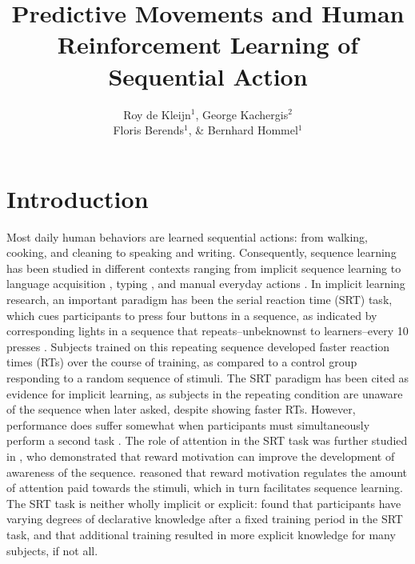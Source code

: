 \documentclass[man,floatsintext]{apa6}
\title{Predictive Movements and Human Reinforcement Learning of Sequential Action}
\author{
 Roy de Kleijn$^{1}$, George Kachergis$^{2}$ \\
 Floris Berends$^{1}$, \& Bernhard Hommel$^{1}$
}
\affiliation{
$^{1}$Cognitive Psychology Unit, Leiden University \\
  Leiden, the Netherlands \\
$^{2}$Department of Artificial Intelligence, Radboud University \\
  Nijmegen, the Netherlands
}
\begin{document}
\maketitle

\section{Introduction} 

Most daily human behaviors are learned sequential actions: from walking, cooking, and cleaning to speaking and writing. Consequently, sequence learning has been studied in different contexts ranging from implicit sequence learning \cite{Nissen:1987,Cleeremans:1991,Stadler:1992,Boyer:2005} to language acquisition \cite{Elman:1990,Saffran:1996}, typing \cite{Fendrick:1937,Gentner:1988}, and manual everyday actions \cite{Cooper:2000,Botvinick:2004}. In implicit learning research, an important paradigm has been the serial reaction time (SRT) task, which cues participants to press four buttons in a sequence, as indicated by corresponding lights in a sequence that repeats--unbeknownst to learners--every 10 presses \cite{Nissen:1987}. Subjects trained on this repeating sequence developed faster reaction times (RTs) over the course of training, as compared to a control group responding to a random sequence of stimuli. The SRT paradigm has been cited as evidence for implicit learning, as subjects in the repeating condition are unaware of the sequence when later asked, despite showing faster RTs. However, performance does suffer somewhat when participants must simultaneously perform a second task \cite{Nissen:1987}. The role of attention in the SRT task was further studied in , who demonstrated that reward motivation can improve the development of awareness of the sequence.  reasoned that reward motivation regulates the amount of attention paid towards the stimuli, which in turn facilitates sequence learning. The SRT task is neither wholly implicit or explicit:  found that participants have varying degrees of declarative knowledge after a fixed training period in the SRT task, and that additional training resulted in more explicit knowledge for many subjects, if not all. 
\end{document}
